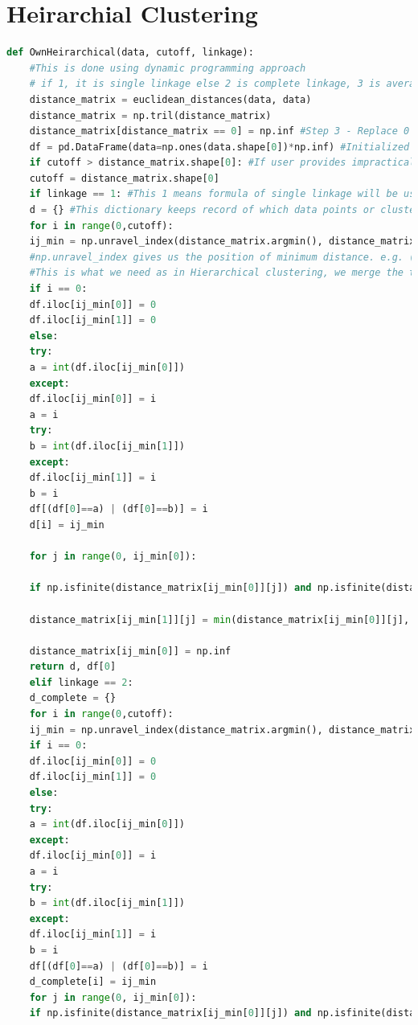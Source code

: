\documentclass{article}
\begin{document}
\section{Heirarchial Clustering}
\begin{lstlisting}[language=Python]
	def OwnHeirarchical(data, cutoff, linkage):
	#This is done using dynamic programming approach
	# if 1, it is single linkage else 2 is complete linkage, 3 is average linkage
	distance_matrix = euclidean_distances(data, data) 
	distance_matrix = np.tril(distance_matrix) 
	distance_matrix[distance_matrix == 0] = np.inf #Step 3 - Replace 0 by inf, it makes it easy for us to extract minimum using min function
	df = pd.DataFrame(data=np.ones(data.shape[0])*np.inf) #Initialized a dataframe which will store which point is in which cluster
	if cutoff > distance_matrix.shape[0]: #If user provides impractical cut-off, cluster everthing into one cluster and not listen to user 
	cutoff = distance_matrix.shape[0]
	if linkage == 1: #This 1 means formula of single linkage will be used, it is explained ahead
	d = {} #This dictionary keeps record of which data points or cluster are merging, hence can be used to make a dendogram
	for i in range(0,cutoff):
	ij_min = np.unravel_index(distance_matrix.argmin(), distance_matrix.shape) #from the distance matrix, get the minimum distance
	#np.unravel_index gives us the position of minimum distance. e.g. (0,4) is where minimum value is present in matrix.
	#This is what we need as in Hierarchical clustering, we merge the two pairs with minimum distance
	if i == 0:
	df.iloc[ij_min[0]] = 0
	df.iloc[ij_min[1]] = 0
	else:
	try:
	a = int(df.iloc[ij_min[0]])
	except:
	df.iloc[ij_min[0]] = i
	a = i
	try:
	b = int(df.iloc[ij_min[1]])
	except:
	df.iloc[ij_min[1]] = i
	b = i
	df[(df[0]==a) | (df[0]==b)] = i
	d[i] = ij_min
	
	for j in range(0, ij_min[0]):
	
	if np.isfinite(distance_matrix[ij_min[0]][j]) and np.isfinite(distance_matrix[ij_min[1]][j]):
	
	distance_matrix[ij_min[1]][j] = min(distance_matrix[ij_min[0]][j], distance_matrix[ij_min[1]][j])
	
	distance_matrix[ij_min[0]] = np.inf
	return d, df[0]
	elif linkage == 2:
	d_complete = {}
	for i in range(0,cutoff):
	ij_min = np.unravel_index(distance_matrix.argmin(), distance_matrix.shape)
	if i == 0:
	df.iloc[ij_min[0]] = 0
	df.iloc[ij_min[1]] = 0
	else:
	try:
	a = int(df.iloc[ij_min[0]])
	except:
	df.iloc[ij_min[0]] = i
	a = i
	try:
	b = int(df.iloc[ij_min[1]])
	except:
	df.iloc[ij_min[1]] = i
	b = i
	df[(df[0]==a) | (df[0]==b)] = i
	d_complete[i] = ij_min
	for j in range(0, ij_min[0]):
	if np.isfinite(distance_matrix[ij_min[0]][j]) and np.isfinite(distance_matrix[ij_min[1]][j]):
	

\end{lstlisting}
\end{document}
